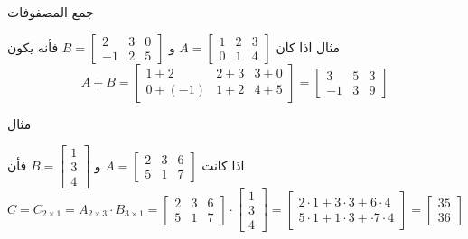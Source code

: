 		\begin{frame}{جمع المصفوفات}
			\begin{exampleblock}{مثال}
						اذا كان 
				$A = 
				\begin{bmatrix}
					1&2&3\\
					0&1&4
				\end{bmatrix}
				$
				و
				$
				B=
				\begin{bmatrix}
					2&3&0\\
					-1&2&5
				\end{bmatrix}
				$
				فأنه يكون
				\[
				A+B=
				\begin{bmatrix}
					1+2&2+3&3+0\\
					0+(-1)&1+2&4+5
				\end{bmatrix}=
				\begin{bmatrix}
					3&5&3\\
					-1&3&9
				\end{bmatrix}
				\]
			\end{exampleblock}
		\end{frame}
		
		\begin{frame}
			\begin{exampleblock}{مثال}
				
				اذا كانت 
				$A=
				\begin{bmatrix}
					2&3&6\\
					5&1&7
				\end{bmatrix}
				$
				و
				$
				B=
				\begin{bmatrix}
					1\\3\\4
				\end{bmatrix}
				$
				فأن
				\[
				C=C_{2\times 1} = A_{2\times 3}\cdot B_{3\times 1}=\begin{bmatrix}
					2&3&6\\
					5&1&7
				\end{bmatrix}\cdot
				\begin{bmatrix}
					1\\3\\4
				\end{bmatrix}=
				\begin{bmatrix}
					2\cdot1+3\cdot3+6\cdot4\\
					5\cdot1+1\cdot3+\cdot7\cdot4
				\end{bmatrix}=
				\begin{bmatrix}
					35\\
					36
				\end{bmatrix}
				\]
			\end{exampleblock}
		\end{frame}
		
